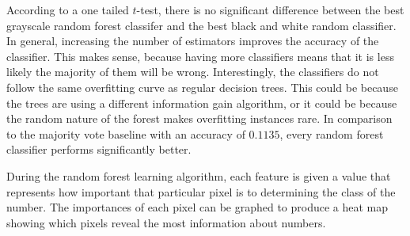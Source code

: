 \documentclass[12pt]{article}
\begin{document}
According to a one tailed $t$-test, there is no significant difference between the best grayscale random forest classifer and the best black and white random classifier. In general, increasing the number of estimators improves the accuracy of the classifier. This makes sense, because having more classifiers means that it is less likely the majority of them will be wrong. Interestingly, the classifiers do not follow the same overfitting curve as regular decision trees. This could be because the trees are using a different information gain algorithm, or it could be because the random nature of the forest makes overfitting instances rare. In comparison to the majority vote baseline with an accuracy of $0.1135$, every random forest classifier performs significantly better.

During the random forest learning algorithm, each feature is given a value that represents how important that particular pixel is to determining the class of the number. The importances of each pixel can be graphed to produce a heat map showing which pixels reveal the most information about numbers.
\end{document}
